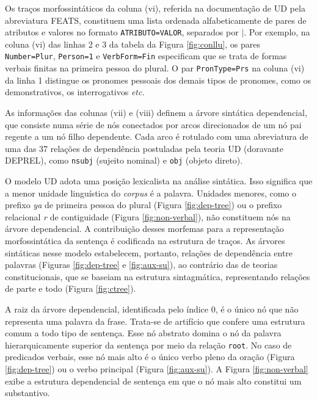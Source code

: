 \documentclass[portuguese]{textolivre}
\begin{document}
Os traços morfossintáticos da coluna (vi), referida na documentação de UD pela abreviatura FEATS, constituem uma lista ordenada alfabeticamente de pares de atributos e valores no formato \texttt{ATRIBUTO=VALOR}, separados por $|$. Por exemplo, na coluna (vi) das linhas 2 e 3 da tabela da Figura \ref{fig:conllu}, os pares \texttt{Number=Plur}, \texttt{Person=1} e \texttt{VerbForm=Fin} especificam que se trata de formas verbais finitas na primeira pessoa do plural. O par \texttt{PronType=Prs} na coluna (vi) da linha 1 distingue os pronomes pessoais dos demais tipos de pronomes, como os demonstrativos, os interrogativos	\textit{etc.}

As informações das colunas (vii) e (viii) definem a árvore sintática dependencial, que consiste numa série de nós conectados por arcos direcionados de um nó pai regente a um nó filho dependente. Cada arco é rotulado com uma abreviatura de uma das 37 relações de dependência postuladas pela teoria UD (doravante DEPREL), como \texttt{nsubj} (sujeito nominal) e \texttt{obj} (objeto direto).

O modelo UD adota uma posição lexicalista na análise sintática. Isso significa que a menor unidade linguística do \textit{corpus} é a palavra. Unidades menores, como o prefixo \textit{ya} de primeira pessoa do plural (Figura \ref{fig:dep-tree}) ou o prefixo relacional \textit{r} de contiguidade (Figura \ref{fig:non-verbal}), não constituem nós na árvore dependencial. A contribuição desses morfemas para a representação morfossintática da sentença é codificada na estrutura de traços. As árvores sintáticas nesse modelo estabelecem, portanto, relações de dependência entre palavras (Figuras \ref{fig:dep-tree} e \ref{fig:aux-su}), ao contrário das de teorias constitucionais, que se baseiam na estrutura sintagmática, representando relações de parte e todo (Figura \ref{fig:ctree}). 

A raiz da árvore dependencial, identificada pelo índice 0, é o único nó que não representa uma palavra da frase. Trata-se de artifício que confere uma estrutura comum a todo tipo de sentença. Esse nó abstrato domina o nó da palavra hierarquicamente superior da sentença por meio da relação \texttt{root}. No caso de predicados verbais, esse nó mais alto é o único verbo pleno da oração (Figura \ref{fig:dep-tree}) ou o verbo principal (Figura \ref{fig:aux-su}). A Figura \ref{fig:non-verbal} exibe a estrutura dependencial de sentença em que o nó mais alto constitui um substantivo.  
\end{document}

